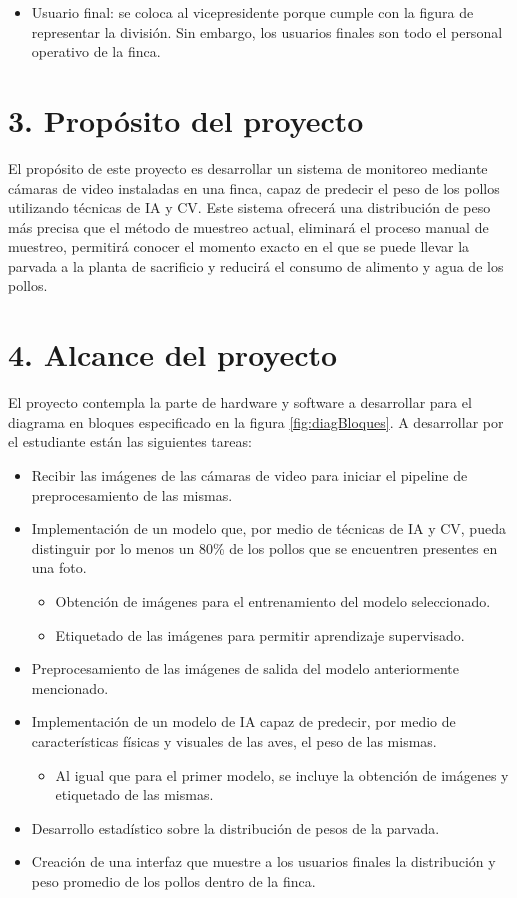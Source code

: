 \documentclass[
11pt, %
]{charter}
\begin{document}
\begin{itemize}
	\item Usuario final: se coloca al vicepresidente porque cumple con la figura de representar la división. Sin embargo, los usuarios finales son todo el personal operativo de la finca.
\end{itemize}

\section{3. Propósito del proyecto}
\label{sec:proposito}
El propósito de este proyecto es desarrollar un sistema de monitoreo mediante cámaras de video instaladas en una finca, capaz de predecir el peso de los pollos utilizando técnicas de IA y CV. Este sistema ofrecerá una distribución de peso más precisa que el método de muestreo actual, eliminará el proceso manual de muestreo, permitirá conocer el momento exacto en el que se puede llevar la parvada a la planta de sacrificio y reducirá el consumo de alimento y agua de los pollos.

\section{4. Alcance del proyecto}
\label{sec:alcance}
El proyecto contempla la parte de hardware y software a desarrollar para el diagrama en bloques especificado en la figura \ref{fig:diagBloques}. A desarrollar por el estudiante están las siguientes tareas:

\begin{itemize}
\item Recibir las imágenes de las cámaras de video para iniciar el pipeline de preprocesamiento de las mismas.
\item Implementación de un modelo que, por medio de técnicas de IA y CV, pueda distinguir por lo menos un 80\% de los pollos que se encuentren presentes en una foto.
	\begin{itemize}
	\item Obtención de imágenes para el entrenamiento del modelo seleccionado.
	\item Etiquetado de las imágenes para permitir aprendizaje supervisado.
	\end{itemize}
\item Preprocesamiento de las imágenes de salida del modelo anteriormente mencionado.
\item Implementación de un modelo de IA capaz de predecir, por medio de características físicas y visuales de las aves, el peso de las mismas.
	\begin{itemize}
	\item Al igual que para el primer modelo, se incluye la obtención de imágenes y etiquetado de las mismas.
	\end{itemize}
\item Desarrollo estadístico sobre la distribución de pesos de la parvada.
\item Creación de una interfaz que muestre a los usuarios finales la distribución y peso promedio de los pollos dentro de la finca.
\end{itemize}
\end{document}
